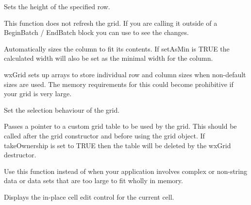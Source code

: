 Sets the height of the specified row. 

This function does not refresh the grid. If you are calling it outside of a BeginBatch / EndBatch
block you can use  to see the changes. 

Automatically sizes the column to fit its contents. If setAsMin is TRUE the calculated width will
also be set as the minimal width for the column.


wxGrid sets up arrays to store individual row and column sizes when non-default sizes are used.
The memory requirements for this could become prohibitive if your grid is very large. 

\label{wxgridsetselectionmode}


Set the selection behaviour of the grid.





\label{wxgridsettable}


Passes a pointer to a custom grid table to be used by the grid. This should be called
after the grid constructor and before using the grid object. If takeOwnership is set to
TRUE then the table will be deleted by the wxGrid destructor. 

Use this function instead of  when your
application involves complex or non-string data or data sets that are too large to fit
wholly in memory. 

\label{wxgridshowcelleditcontrol}


Displays the in-place cell edit control for the current cell.


